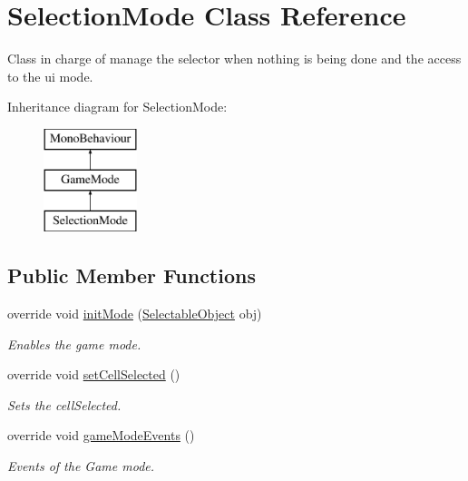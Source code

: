 \hypertarget{class_selection_mode}{}\section{Selection\+Mode Class Reference}
\label{class_selection_mode}


Class in charge of manage the selector when nothing is being done and the access to the ui mode.  


Inheritance diagram for Selection\+Mode\+:\begin{figure}[H]
\begin{center}
\leavevmode
\includegraphics[height=3.000000cm]{class_selection_mode}
\end{center}
\end{figure}
\subsection*{Public Member Functions}
\begin{DoxyCompactItemize}
\item 
override void \mbox{\hyperlink{class_selection_mode_a6a73f2cb41889a41fcffaa417119d921}{init\+Mode}} (\mbox{\hyperlink{class_selectable_object}{Selectable\+Object}} obj)
\begin{DoxyCompactList}\small\item\em Enables the game mode. \end{DoxyCompactList}\item 
override void \mbox{\hyperlink{class_selection_mode_a2abd35e0ae4625320cb5ee5b35e3d759}{set\+Cell\+Selected}} ()
\begin{DoxyCompactList}\small\item\em Sets the cell\+Selected. \end{DoxyCompactList}\item 
override void \mbox{\hyperlink{class_selection_mode_a72054e5ce70eca2fbc50e8762a9d8c70}{game\+Mode\+Events}} ()
\begin{DoxyCompactList}\small\item\em Events of the Game mode. \end{DoxyCompactList}\end{DoxyCompactItemize}
